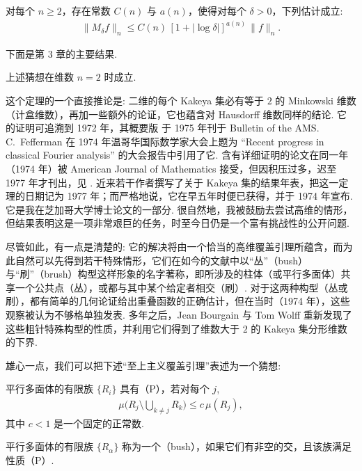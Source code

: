 \begin{conjecture*}
对每个 $n \ge 2$，存在常数 $C(n)$ 与 $a(n)$，使得对每个 $\delta > 0$，下列估计成立:
\begin{align*}
  \|M_\delta f\|_n \le C(n) \, [1 + |\log \delta|]^{a(n)} \, \|f\|_n.
\end{align*}
\end{conjecture*}

下面是第 3 章的主要结果.

\begin{theorem*}
上述猜想在维数 $n=2$ 时成立.
\end{theorem*}

这个定理的一个直接推论是: 二维的每个 Kakeya 集必有等于 $2$ 的 Minkowski 维数（计盒维数），再加一些额外的论证，它也蕴含对 Hausdorff 维数同样的结论. 它的证明可追溯到 1972 年，其概要版 \cite{b41} 于 1975 年刊于 Bulletin of the AMS. C.~Fefferman 在 1974 年温哥华国际数学家大会上题为 ``Recent progress in classical Fourier analysis'' 的大会报告中引用了它. 含有详细证明的论文在同一年（1974 年）被 American Journal of Mathematics 接受，但因积压过多，迟至 1977 年才刊出，见 \cite{b65}. 近来若干作者撰写了关于 Kakeya 集的结果年表，把这一定理的日期记为 1977 年；而严格地说，它在早五年时便已获得，并于 1974 年宣布. 它是我在芝加哥大学博士论文的一部分. 很自然地，我被鼓励去尝试高维的情形，但结果表明这是一项非常艰巨的任务，时至今日仍是一个富有挑战性的公开问题.

尽管如此，有一点是清楚的: 它的解决将由一个恰当的高维覆盖引理所蕴含，而为此自然可以先得到若干特殊情形，它们在如今的文献中以``丛''（bush）与``刷''（brush）构型这样形象的名字著称，即所涉及的柱体（或平行多面体）共享一个公共点（丛），或都与其中某个给定者相交（刷）. 对于这两种构型（丛或刷），都有简单的几何论证给出重叠函数的正确估计，但在当时（1974 年），这些观察被认为不够格单独发表. 多年之后，Jean Bourgain 与 Tom Wolff 重新发现了这些粗针特殊构型的性质，并利用它们得到了维数大于 $2$ 的 Kakeya 集分形维数的下界.

雄心一点，我们可以把下述``至上主义覆盖引理''表述为一个猜想:

\begin{definition*}
平行多面体的有限族 $\{R_i\}$ 具有（P），若对每个 $j$,
\begin{align*}
  \mu\Big( R_j \setminus \bigcup_{k \ne j} R_k \Big) \le c \, \mu(R_j),
\end{align*}
其中 $c < 1$ 是一个固定的正常数.
\end{definition*}

\begin{definition*}
平行多面体的有限族 $\{R_\alpha\}$ 称为一个（bush），如果它们有非空的交，且该族满足性质（P）.
\end{definition*}

